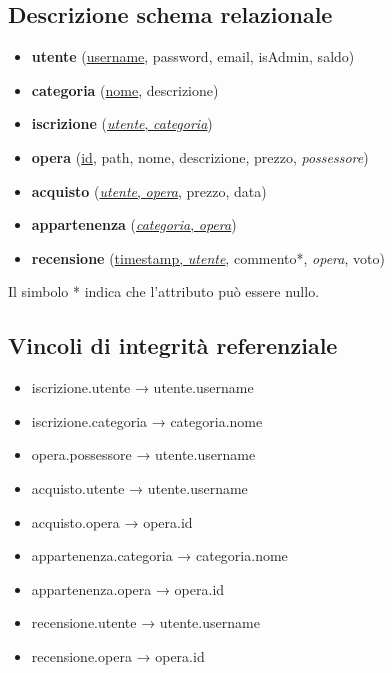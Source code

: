 \documentclass[10pt]{article}
\begin{document}
\subsection{Descrizione schema relazionale}
\begin{itemize}
    \item \textbf{utente} (\underline{username}, password, email, isAdmin, saldo)
    \item \textbf{categoria} (\underline{nome}, descrizione)
    \item \textbf{iscrizione} (\underline{\textit{utente}, \textit{categoria}})
    \item \textbf{opera} (\underline{id}, path, nome, descrizione, prezzo, \textit{possessore})
    \item \textbf{acquisto} (\underline{\textit{utente}, \textit{opera}}, prezzo, data)
    \item \textbf{appartenenza} (\underline{\textit{categoria}, \textit{opera}})
    \item \textbf{recensione} (\underline{timestamp, \textit{utente}}, commento*, \textit{opera}, voto)
\end{itemize}
Il simbolo * indica che l'attributo può essere nullo.

\subsection{Vincoli di integrità referenziale }
\begin{itemize}
    \item iscrizione.utente → utente.username
    \item iscrizione.categoria → categoria.nome
    \item opera.possessore → utente.username
    \item acquisto.utente → utente.username
    \item acquisto.opera → opera.id
    \item appartenenza.categoria → categoria.nome
    \item appartenenza.opera → opera.id
    \item recensione.utente → utente.username
    \item recensione.opera → opera.id
\end{itemize}
\end{document}
